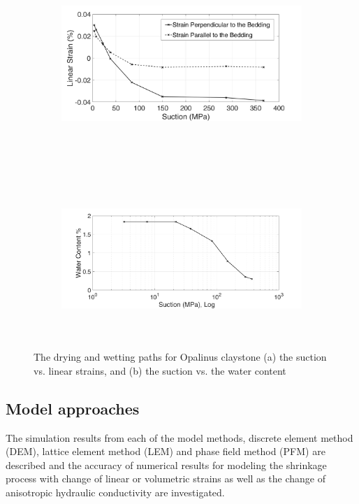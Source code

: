 \begin{figure}[!ht]
\begin{subfigure}[b]{1\textwidth}
\centering
\includegraphics[width=11cm,height=6cm]{figures/Amir_ME6_Strain.png}
\subcaption{}
\label{fig:Amir_ME6_Strain}
\end{subfigure}
\\
\begin{subfigure}[b]{1\textwidth}
\centering
\includegraphics[width=11cm,height=6cm]{figures/Amir_ME6_Water.png}
\subcaption{}
\label{fig:Amir_ME6_Water}
\end{subfigure}
\caption{The drying and wetting paths for Opalinus claystone (a) the suction vs. linear strains, and (b) the suction vs. the water content}
\end{figure}


\subsection{Model approaches}

The simulation results from each of the model methods, discrete element method (DEM), lattice element method (LEM) and phase field method (PFM) are described and the accuracy of numerical results for modeling the shrinkage process with change of linear or volumetric strains as well as the change of anisotropic hydraulic conductivity are investigated. 

